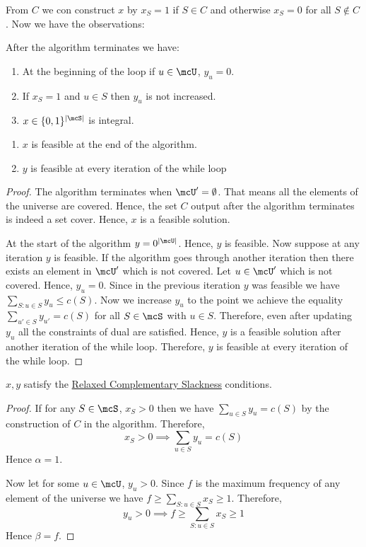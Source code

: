 From $C$ we con construct $x$ by $x_S=1$ if $S\in C$ and otherwise $x_S=0$ for all $S\notin C$. Now we have the observations:
\begin{observation*}After the algorithm terminates we have:
    \begin{enumerate}
        \item At the beginning of the loop if $u\in\mcU$, $y_u=0$.
        \item If $x_S=1$ and $u\in S$ then $y_u$ is not increased.
        \item $x\in\{0,1\}^{|\mcS|}$ is integral.
    \end{enumerate}
\end{observation*}
\begin{lemma}{}{}
    \begin{enumerate}
        \item $x$ is feasible at the end of the algorithm.
        \item $y$ is feasible at every iteration of the while loop
    \end{enumerate}
\end{lemma}
\begin{proof}
    The algorithm terminates when $\mcU'=\emptyset$. That means all the elements of the universe are covered. Hence, the set $C$ output after the algorithm terminates is indeed a set cover. Hence, $x$ is a feasible solution.

    At the start of the algorithm $y=0^{|\mcU|}$. Hence, $y$ is feasible. Now suppose at any iteration $y$ is feasible. If the algorithm goes through another iteration then there exists an element in $\mcU'$ which is not covered. Let $u\in\mcU'$ which is not covered. Hence, $y_u=0$. Since in the previous iteration $y$ was feasible we have $\sum\limits_{S:u\in S}y_u\leq c(S)$. Now we increase $y_u$ to the point we achieve the equality $\sum\limits_{u'\in S}y_{u'}=c(S)$ for all $S\in\mcS$ with $u\in S$. Therefore, even after updating $y_u$ all the constraints of dual are satisfied. Hence, $y$ is a feasible solution after another iteration of the while loop. Therefore, $y$ is feasible at every iteration of the while loop.
\end{proof}

\begin{lemma}{}{}
    $x,y$ satisfy the \hyperref[th:relaxed-cs]{Relaxed Complementary Slackness} conditions.
\end{lemma}
\begin{proof}
    If for any $S\in\mcS$, $x_S>0$ then we have $\sum\limits_{u\in S}y_u=c(S)$ by the construction of $C$ in the algorithm. Therefore, $$x_S>0\implies \sum\limits_{u\in S}y_u=c(S)$$Hence $\alpha=1$.

    Now let for some $u\in\mcU$, $y_u>0$. Since $f$ is the maximum frequency of any element of the universe we have $f\geq \sum\limits_{S:u\in S}x_S\geq 1$. Therefore, $$y_u>0\implies f\geq \sum\limits_{S:u\in S}x_S\geq 1$$Hence $\beta=f$. 
\end{proof}

